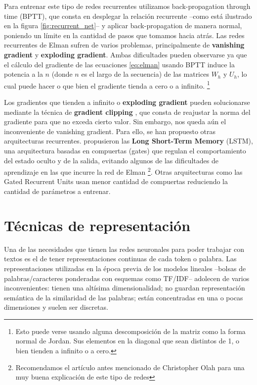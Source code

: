 Para entrenar este tipo de redes recurrentes utilizamos back-propagation through time (BPTT), que consta en desplegar la relación recurrente --como está ilustrado en la figura \ref{fig:recurrent_net}-- y aplicar back-propagation de manera normal, poniendo un límite en la cantidad de pasos que tomamos hacia atrás. Las redes recurrentes de Elman sufren de varios problemas, principalmente de \textbf{vanishing gradient} y \textbf{exploding gradient}. Ambas dificultades pueden observarse ya que el cálculo del gradiente de las ecuaciones \ref{eq:elman} usando BPTT induce la potencia a la $n$ (donde $n$ es el largo de la secuencia) de las matrices $W_h$ y $U_h$, lo cual puede hacer o que bien el gradiente tienda a cero o a infinito. \footnote{ Esto puede verse usando alguna descomposición de la matriz como la forma normal de Jordan. Sus elementos en la diagonal que sean distintos de 1, o bien tienden a infinito o a cero.}

Los gradientes que tienden a infinito o \textbf{exploding gradient} pueden solucionarse mediante la técnica de \textbf{gradient clipping} \cite{goodfellow2016deep}, que consta de reajustar la norma del gradiente para que no exceda cierto valor. Sin embargo, nos queda aún el inconveniente de vanishing gradient. Para ello, se han propuesto otras arquitecturas recurrentes. \citet{hochreiter1997long} propusieron las \textbf{Long Short-Term Memory} (LSTM), una arquitectura basadas en compuertas (gates) que regulan el comportamiento del estado oculto y de la salida, evitando algunos de las dificultades de aprendizaje en las que incurre la red de Elman \footnote{Recomendamos el artículo antes mencionado de Christopher Olah para una muy buena explicación de este tipo de redes}. Otras arquitecturas como las Gated Recurrent Units \cite{cho-etal-2014-learning} usan menor cantidad de compuertas reduciendo la cantidad de parámetros a entrenar.

\section{Técnicas de representación}
\label{sec:02_representaciones}

Una de las necesidades que tienen las redes neuronales para poder trabajar con textos es el de tener representaciones continuas de cada token o palabra. Las representaciones utilizadas en la época previa de los modelos lineales --bolsas de palabras/caracteres ponderadas con esquemas como TF/IDF-- adolecen de varios inconvenientes: tienen una altísima dimensionalidad; no guardan representación semántica de la similaridad de las palabras; están concentradas en una o pocas dimensiones y suelen ser discretas.

